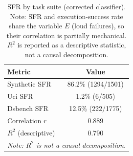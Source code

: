 \begin{table}[t]
\centering
\caption{SFR by task suite (corrected classifier). Note: SFR and execution-success rate share the variable $E$ (loud failures), so their correlation is partially mechanical. $R^2$ is reported as a descriptive statistic, not a causal decomposition.}
\label{tab:null-model}
\small
\begin{tabular}{@{}lc@{}}
\toprule
Metric & Value \\
\midrule
\quad Synthetic SFR & 86.2\% (1294/1501) \\
\quad Uci SFR & 1.2\% (6/505) \\
\quad Dsbench SFR & 12.5\% (222/1775) \\
\midrule
Correlation $r$ & 0.889 \\
$R^2$ (descriptive) & 0.790 \\
\multicolumn{2}{l}{\textit{Note: $R^2$ is not a causal decomposition.}} \\
\bottomrule
\end{tabular}
\end{table}
